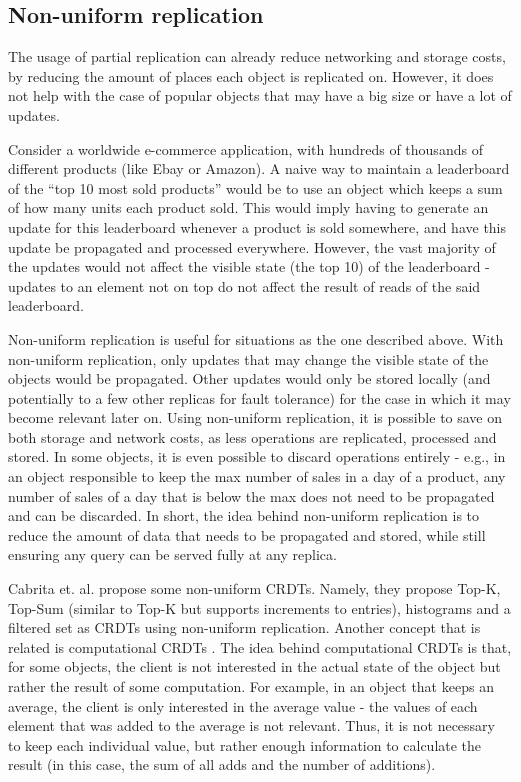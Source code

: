 \subsection{Non-uniform replication}
\label{subsec:nonuniform}

The usage of partial replication can already reduce networking and storage costs, by reducing the amount of places each object is replicated on.
However, it does not help with the case of popular objects that may have a big size or have a lot of updates.

Consider a worldwide e-commerce application, with hundreds of thousands of different products (like Ebay or Amazon).
A naive way to maintain a leaderboard of the ``top 10 most sold products'' would be to use an object which keeps a sum of how many units each product sold.
This would imply having to generate an update for this leaderboard whenever a product is sold somewhere, and have this update be propagated and processed everywhere.
However, the vast majority of the updates would not affect the visible state (the top 10) of the leaderboard - updates to an element not on top do not affect the result of reads of the said leaderboard.

Non-uniform replication \cite{nonUniform} is useful for situations as the one described above.
With non-uniform replication, only updates that may change the visible state of the objects would be propagated.
Other updates would only be stored locally (and potentially to a few other replicas for fault tolerance) for the case in which it may become relevant later on.
Using non-uniform replication, it is possible to save on both storage and network costs, as less operations are replicated, processed and stored.
In some objects, it is even possible to discard operations entirely \cite{nonUniform} - e.g., in an object responsible to keep the max number of sales in a day of a product, any number of sales of a day that is below the max does not need to be propagated and can be discarded.
In short, the idea behind non-uniform replication is to reduce the amount of data that needs to be propagated and stored, while still ensuring any query can be served fully at any replica.

Cabrita et. al. \cite{nonUniform, nonUniformThesis} propose some non-uniform CRDTs.
Namely, they propose Top-K, Top-Sum (similar to Top-K but supports increments to entries), histograms and a filtered set as CRDTs using non-uniform replication.
Another concept that is related is computational CRDTs \cite{computationalCrdt}.
The idea behind computational CRDTs is that, for some objects, the client is not interested in the actual state of the object but rather the result of some computation.
For example, in an object that keeps an average, the client is only interested in the average value - the values of each element that was added to the average is not relevant.
Thus, it is not necessary to keep each individual value, but rather enough information to calculate the result (in this case, the sum of all adds and the number of additions).

